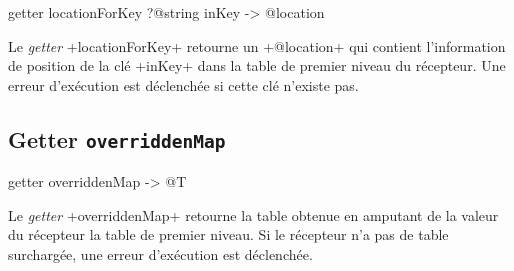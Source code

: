 
\begin{galgas4}
getter locationForKey ?@string inKey -> @location
\end{galgas4}


Le \emph{getter} \ggsq+locationForKey+ retourne un \ggsq+@location+ qui contient l'information de position de la clé \ggsq+inKey+ dans la table de premier niveau du récepteur. Une erreur d'exécution est déclenchée si cette clé n'existe pas.








\subsection{Getter \texttt{overriddenMap}}

\begin{galgas4}
getter overriddenMap -> @T
\end{galgas4}


Le \emph{getter} \ggsq+overriddenMap+ retourne la table obtenue en amputant de la valeur du récepteur la table de premier niveau. Si le récepteur n'a pas de table surchargée, une erreur d'exécution est déclenchée.









